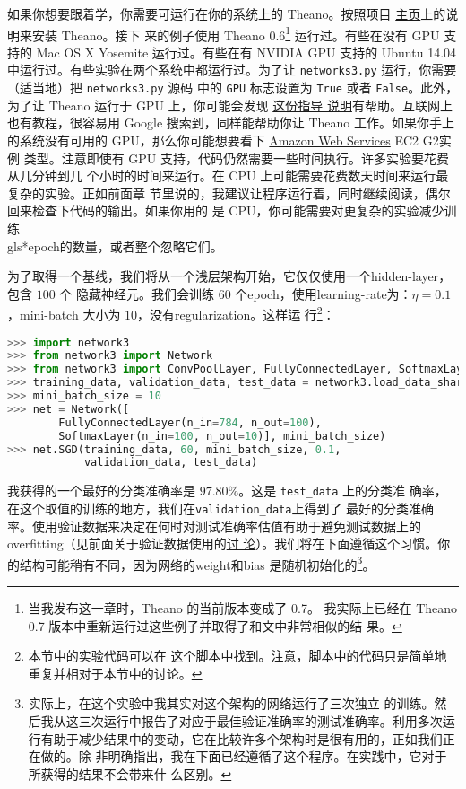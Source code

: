 如果你想要跟着学，你需要可运行在你的系统上的 Theano。按照项目%
\href{http://deeplearning.net/software/theano/}{主页}上的说明来安装 Theano。接下
来的例子使用 Theano 0.6\footnote{当我发布这一章时，Theano 的当前版本变成了 0.7。
  我实际上已经在 Theano 0.7 版本中重新运行过这些例子并取得了和文中非常相似的结
  果。} 运行过。有些在没有 GPU 支持的 Mac OS X Yosemite 运行过。有些在有 NVIDIA
GPU 支持的 Ubuntu 14.04 中运行过。有些实验在两个系统中都运行过。为了让
\lstinline!networks3.py! 运行，你需要（适当地）把 \lstinline!networks3.py! 源码
中的 \lstinline!GPU! 标志设置为 \lstinline!True! 或者 \lstinline!False!。此外，
为了让 Theano 运行于 GPU 上，你可能会发现%
\href{http://deeplearning.net/software/theano/tutorial/using_gpu.html}{这份指导
  说明}有帮助。互联网上也有教程，很容易用 Google 搜索到，同样能帮助你让 Theano
工作。如果你手上的系统没有可用的 GPU，那么你可能想要看下
\href{http://aws.amazon.com/ec2/instance-types/}{Amazon Web Services} EC2 G2实例
类型。注意即使有 GPU 支持，代码仍然需要一些时间执行。许多实验要花费从几分钟到几
个小时的时间来运行。在 CPU 上可能需要花费数天时间来运行最复杂的实验。正如前面章
节里说的，我建议让程序运行着，同时继续阅读，偶尔回来检查下代码的输出。如果你用的
是 CPU，你可能需要对更复杂的实验减少训练\\gls*{epoch}的数量，或者整个忽略它们。

为了取得一个基线，我们将从一个浅层架构开始，它仅仅使用一个\gls*{hidden-layer}，包含 $100$ 个
隐藏神经元。我们会训练 60 个\gls*{epoch}，使用\gls*{learning-rate}为：$\eta =
0.1$，\gls*{mini-batch} 大小为 $10$，没有\gls*{regularization}。这样运
行\footnote{本节中的实验代码可以在%
  \href{https://github.com/mnielsen/neural-networks-and-deep-learning/blob/master/src/conv.py}{%
    这个脚本中}找到。注意，脚本中的代码只是简单地重复并相对于本节中的讨论。}：
\begin{lstlisting}[language=Python]
>>> import network3
>>> from network3 import Network
>>> from network3 import ConvPoolLayer, FullyConnectedLayer, SoftmaxLayer
>>> training_data, validation_data, test_data = network3.load_data_shared()
>>> mini_batch_size = 10
>>> net = Network([
        FullyConnectedLayer(n_in=784, n_out=100),
        SoftmaxLayer(n_in=100, n_out=10)], mini_batch_size)
>>> net.SGD(training_data, 60, mini_batch_size, 0.1, 
            validation_data, test_data)
\end{lstlisting}

我获得的一个最好的分类准确率是 $97.80$\%。这是 \lstinline!test_data! 上的分类准
确率，在这个取值的训练\epoch{}的地方，我们在\lstinline!validation_data!上得到了
最好的分类准确率。使用验证数据来决定在何时对测试准确率估值有助于避免测试数据上的
\gls*{overfitting}（见前面关于验证数据使用的\hyperref[validation_explanation]{讨
    论}）。我们将在下面遵循这个习惯。你的结构可能稍有不同，因为网络的\gls*{weight}和\gls*{bias}
是随机初始化的\footnote{实际上，在这个实验中我其实对这个架构的网络运行了三次独立
  的训练。然后我从这三次运行中报告了对应于最佳验证准确率的测试准确率。利用多次运
  行有助于减少结果中的变动，它在比较许多个架构时是很有用的，正如我们正在做的。除
  非明确指出，我在下面已经遵循了这个程序。在实践中，它对于所获得的结果不会带来什
  么区别。}。

